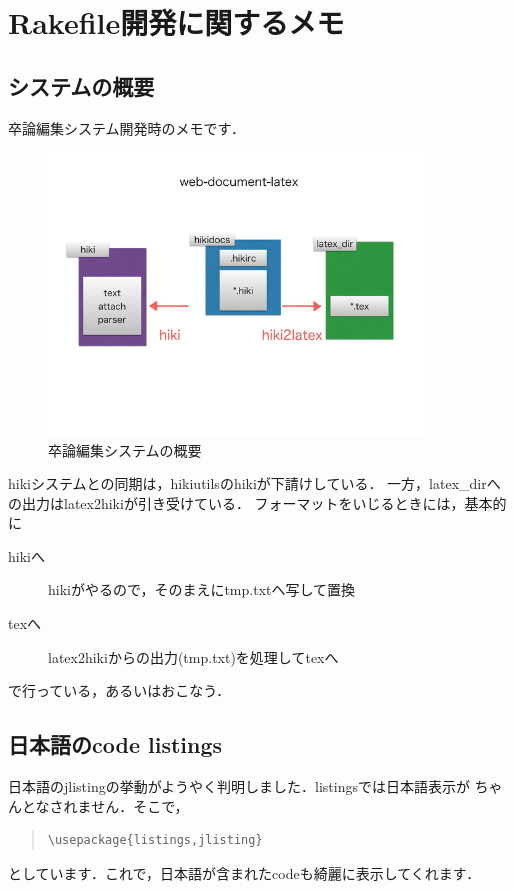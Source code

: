\section{Rakefile開発に関するメモ}
\subsection{システムの概要}
卒論編集システム開発時のメモです．

\begin{figure}[htbp]\begin{center}
\includegraphics[width=10cm,bb= 0 0 737 453]{../figs/./hikiutils_bob.006.jpeg}
\caption{卒論編集システムの概要}
\label{default}\end{center}\end{figure}
hikiシステムとの同期は，hikiutilsのhikiが下請けしている．
一方，latex\_dirへの出力はlatex2hikiが引き受けている．
フォーマットをいじるときには，基本的に
\begin{description}
\item[hikiへ] hikiがやるので，そのまえにtmp.txtへ写して置換

\item[texへ] latex2hikiからの出力(tmp.txt)を処理してtexへ

\end{description}
で行っている，あるいはおこなう．

\subsection{日本語のcode listings}
日本語のjlistingの挙動がようやく判明しました．listingsでは日本語表示が
ちゃんとなされません．そこで，
\begin{quote}\begin{verbatim}
\usepackage{listings,jlisting}
\end{verbatim}\end{quote}
としています．これで，日本語が含まれたcodeも綺麗に表示してくれます．


